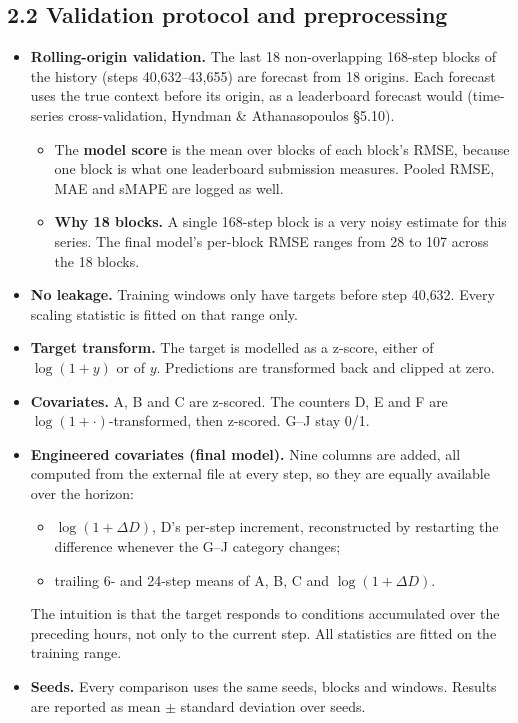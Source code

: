 \subsection*{2.2 Validation protocol and preprocessing}

\begin{itemize}
  \item \textbf{Rolling-origin validation.} The last 18 non-overlapping 168-step blocks of the history (steps 40{,}632--43{,}655) are forecast from 18 origins. Each forecast uses the true context before its origin, as a leaderboard forecast would (time-series cross-validation, Hyndman \& Athanasopoulos \S5.10).
    \begin{itemize}
      \item The \textbf{model score} is the mean over blocks of each block's RMSE, because one block is what one leaderboard submission measures. Pooled RMSE, MAE and sMAPE are logged as well.
      \item \textbf{Why 18 blocks.} A single 168-step block is a very noisy estimate for this series. The final model's per-block RMSE ranges from 28 to 107 across the 18 blocks.
    \end{itemize}
  \item \textbf{No leakage.} Training windows only have targets before step 40{,}632. Every scaling statistic is fitted on that range only.
  \item \textbf{Target transform.} The target is modelled as a z-score, either of $\log(1+y)$ or of $y$. Predictions are transformed back and clipped at zero.
  \item \textbf{Covariates.} A, B and C are z-scored. The counters D, E and F are $\log(1+\cdot)$-transformed, then z-scored. G--J stay 0/1.
  \item \textbf{Engineered covariates (final model).} Nine columns are added, all computed from the external file at every step, so they are equally available over the horizon:
    \begin{itemize}
      \item $\log(1+\Delta D)$, D's per-step increment, reconstructed by restarting the difference whenever the G--J category changes;
      \item trailing 6- and 24-step means of A, B, C and $\log(1+\Delta D)$.
    \end{itemize}
    The intuition is that the target responds to conditions accumulated over the preceding hours, not only to the current step. All statistics are fitted on the training range.
  \item \textbf{Seeds.} Every comparison uses the same seeds, blocks and windows. Results are reported as mean $\pm$ standard deviation over seeds.
\end{itemize}

